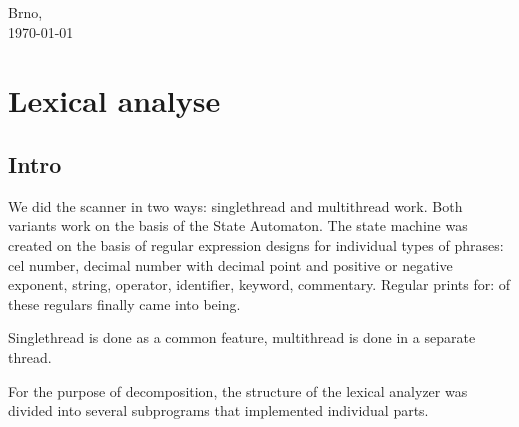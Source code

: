 \documentclass[12pt,a4paper,titlepage]{report}
\begin{document}
\begin{titlepage}

\vspace{3.0cm}

\begin{center}
\normalsize Brno,\\
{\normalsize\today} %
\end{center}

\newpage
\end{titlepage}



\tableofcontents  %
\thispagestyle{empty}
\newpage




\chapter*{Lexical analyse}                                            %
    \section{Intro}

\begin{justify}
We did the scanner in two ways: singlethread and multithread work. Both variants work on the basis of the State Automaton.
The state machine was created on the basis of regular expression designs for individual types of phrases: cel number, decimal number with decimal point and positive or negative exponent, string, operator, identifier, keyword, commentary.\justify
Regular prints for:
of these regulars finally came into being.\justify

Singlethread is done as a common feature, multithread is done in a separate thread.\justify

For the purpose of decomposition, the structure of the lexical analyzer was divided into several subprograms that implemented individual parts.
\end{justify}
\end{document}
